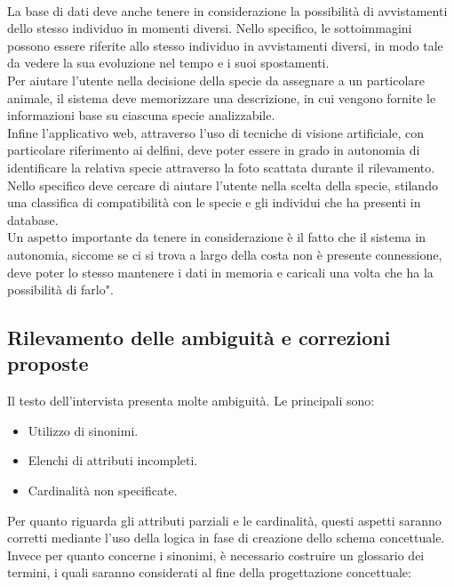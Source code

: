\documentclass[a4paper,final,12pt]{report}
\begin{document}
\\
La base di dati deve anche tenere in considerazione la possibilità di avvistamenti dello stesso individuo in momenti diversi. Nello specifico, le sottoimmagini possono essere riferite allo stesso individuo in avvistamenti diversi, in modo tale da vedere la sua evoluzione nel tempo e i suoi spostamenti.\\
Per aiutare l'utente nella decisione della specie da assegnare a un particolare animale, il sistema deve memorizzare una descrizione, in cui vengono fornite le informazioni base su ciascuna specie analizzabile.
\\
Infine l'applicativo web, attraverso l'uso di tecniche di visione artificiale, con particolare riferimento ai delfini, deve poter essere in grado in autonomia di identificare la relativa specie attraverso la foto scattata durante il rilevamento. Nello specifico deve cercare di aiutare l'utente nella scelta della specie, stilando una classifica di compatibilità con le specie e gli individui che ha presenti in database.
\\
Un aspetto importante da tenere in considerazione è il fatto che il sistema in autonomia, siccome se ci si trova a largo della costa non è presente connessione, deve poter lo stesso mantenere i dati in memoria e caricali una volta che ha la possibilità di farlo".

\subsection{Rilevamento delle ambiguità e correzioni proposte}
Il testo dell'intervista presenta molte ambiguità. Le principali sono:
\begin{itemize}
\item Utilizzo di sinonimi.
\item Elenchi di attributi incompleti.
\item Cardinalità non specificate.
\end{itemize}

Per quanto riguarda gli attributi parziali e le cardinalità, questi aspetti saranno corretti mediante l'uso della logica in fase di creazione dello schema concettuale. Invece per quanto concerne i sinonimi, è necessario costruire un glossario dei termini, i quali saranno considerati al fine della progettazione concettuale:
\end{document}
